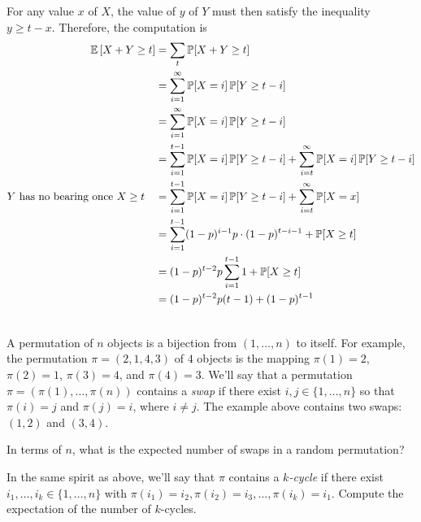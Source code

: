 \documentclass[11pt]{article}
\begin{document}
\begin{solution}
\begin{Parts}
\Part For any value $x$ of $X$, the value of $y$ of $Y$ must then satisfy the
inequality $y \geq t - x$. Therefore, the computation is
\[
    \begin{split}
        \operatorname{\mathbb{E}}\left[X + Y \geq t\right] &= \sum_t \operatorname{\mathbb{P}}[X + Y \geq t] \\
        &= \sum_{i=1}^{\infty} \operatorname{\mathbb{P}}[X =i] \operatorname{\mathbb{P}}[Y \geq t - i] \\
        &= \sum_{i=1}^{\infty} \operatorname{\mathbb{P}}[X =i] \operatorname{\mathbb{P}}[Y \geq t - i] \\
        &= \sum_{i=1}^{t-1} \operatorname{\mathbb{P}}[X =i] \operatorname{\mathbb{P}}[Y \geq t - i] + \sum_{i=t}^{\infty} \operatorname{\mathbb{P}}[X =i] \operatorname{\mathbb{P}}[Y \geq t - i] \\
        \text{$Y$ has no bearing once $X\geq t$} \quad &= \sum_{i=1}^{t-1} \operatorname{\mathbb{P}}[X =i] \operatorname{\mathbb{P}}[Y \geq t - i] + \sum_{i=t}^{\infty} \operatorname{\mathbb{P}}[X =x] \\
        &= \sum_{i=1}^{t-1} (1-p)^{i-1}p \cdot (1-p)^{t-i-1} + \operatorname{\mathbb{P}}[X \geq t] \\\
        &= (1-p)^{t-2}p \sum_{i=1}^{t-1} 1 + \operatorname{\mathbb{P}}[X \geq t] \\\
        &= (1-p)^{t-2}p (t-1)+ (1-p)^{t-1} \\\
    \end{split}
\]

\end{Parts}

\end{solution}

A permutation of $n$ objects is a bijection from $(1,\ldots,n)$ to itself.  For example, the permutation $\pi=(2,1,4,3)$ of $4$ objects is the mapping $\pi(1) = 2$, $\pi(2) = 1$, $\pi(3) = 4$, and $\pi(4) = 3$.
We'll say that a permutation $\pi = (\pi(1),\ldots,\pi(n))$ contains a \emph{swap} if there exist $i,j\in\{1,\ldots,n\}$ so that $\pi(i) = j$ and $\pi(j) = i$, where $i \neq j$. The example above contains two swaps: $(1,2)$ and $(3,4)$.
\begin{Parts}
	\Part In terms of $n$, what is the expected number of swaps in a random permutation?
	
	\Part In the same spirit as above, we'll say that $\pi$ contains a \emph{$k$-cycle} if there exist $i_1,\ldots,i_k \in \{1,\ldots,n\}$ with $\pi(i_1) = i_2,\pi(i_2) = i_3,\ldots,\pi(i_k) = i_1$. Compute the expectation of the number of $k$-cycles. 
	
\end{Parts}
\end{document}
